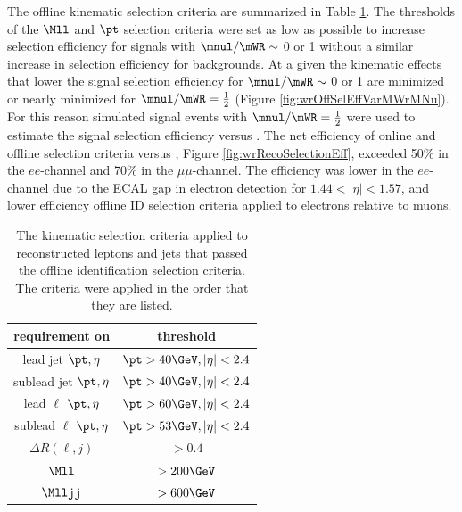 The offline kinematic selection criteria are summarized in Table \ref{tab:offlineKinemSel}.  The thresholds 
of the $\Mll$ and $\pt$ selection criteria were set as low as possible to increase selection efficiency for signals with $\mnul/\mWR \sim$ 0 or 1 
without a similar increase in selection efficiency for backgrounds.  At a given \mWR the kinematic effects that lower the signal selection 
efficiency for $\mnul/\mWR \sim$ 0 or 1 are minimized or nearly minimized for $\mnul/\mWR = \frac{1}{2}$ (Figure \ref{fig:wrOffSelEffVarMWrMNu}).  
For this reason simulated signal events with $\mnul/\mWR = \frac{1}{2}$ were used to estimate the signal selection efficiency versus \mWR.  The 
net efficiency of online and offline selection criteria versus \mWR, Figure \ref{fig:wrRecoSelectionEff}, exceeded 50\% in the $ee$-channel and 
70\% in the $\mu\mu$-channel.  The efficiency was lower in the $ee$-channel due to the ECAL gap in electron detection for $1.44 < |\eta| < 1.57$, 
and lower efficiency offline ID selection criteria applied to electrons relative to muons.

\begin{table}[h]
	\caption{The kinematic selection criteria applied to reconstructed leptons and jets that passed the offline identification 
	selection criteria.  The criteria were applied in the order that they are listed.}
	\label{tab:offlineKinemSel}
	\centering
	\begin{tabular}{c|c}
		requirement on & threshold  \\  \hline
		lead jet $\pt,\eta$ & $\pt>40\GeV,|\eta|<2.4$ \\
		sublead jet $\pt,\eta$ & $\pt>40\GeV,|\eta|<2.4$ \\
		lead $\ell$ $\pt,\eta$ & $\pt>60\GeV,|\eta|<2.4$ \\
		sublead $\ell$ $\pt,\eta$ & $\pt>53\GeV,|\eta|<2.4$ \\
		$\Delta R(\ell,j)$ & $>0.4$ \\
		$\Mll$ & $>200\GeV$ \\
		$\Mlljj$ & $>600\GeV$ \\ \hline
	\end{tabular}
\end{table}

\clearpage


